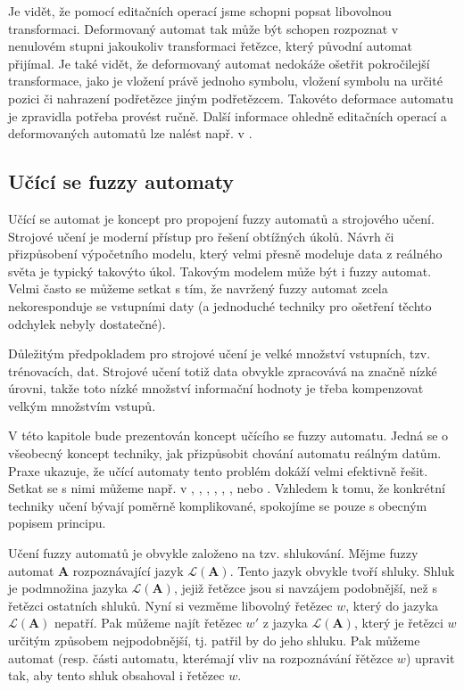 \documentclass[a4paper,10pt]{article}
\begin{document}
Je vidět, že pomocí editačních operací jsme schopni popsat libovolnou transformaci. Deformovaný automat tak může být schopen rozpoznat v nenulovém stupni jakoukoliv transformaci řetězce, který původní automat přijímal. Je také vidět, že deformovaný automat nedokáže ošetřit pokročilejší transformace, jako je vložení právě jednoho symbolu, vložení symbolu na určité pozici či nahrazení podřetězce jiným podřetězcem. Takovéto deformace automatu je zpravidla potřeba provést ručně. Další informace ohledně editačních operací a deformovaných automatů lze nalést např. v \cite{Ast+-FuzzAutEpsMovCmpFuzzMeasBtwStrs}.

\subsection{Učící se fuzzy automaty}
Učící se automat je koncept pro propojení fuzzy automatů a strojového učení. Strojové učení je moderní přístup pro řešení obtížných úkolů. Návrh či přizpůsobení výpočetního modelu, který velmi přesně modeluje data z reálného světa je typický takovýto úkol. Takovým modelem může být i fuzzy automat. Velmi často se můžeme setkat s tím, že navržený fuzzy automat zcela nekoresponduje se vstupními daty (a jednoduché techniky pro ošetření těchto odchylek nebyly dostatečné). 

Důležitým předpokladem pro strojové učení je velké množství vstupních, tzv. trénovacích, dat. Strojové učení totiž data obvykle zpracovává na značně nízké úrovni, takže toto nízké množství informační hodnoty je třeba kompenzovat velkým množstvím vstupů.

V této kapitole bude prezentován koncept učícího se fuzzy automatu. Jedná se o všeobecný koncept techniky, jak přizpůsobit chování automatu reálným datům. Praxe ukazuje, že učící automaty tento problém dokáží velmi efektivně řešit. Setkat se s nimi můžeme např. v \cite{FuLi-ForLeaAutAutGam}, \cite{WeeFu-FormFuzAutAppModLeaSys}, \cite{GilOmlTho-EquKnoRep+}, \cite{TzaRig-StaAnaAdaFuzzConSysUsiPetrNetLeaAut}, \cite{PatMor-EdgDetTecFuzzLogCEllLeaAutFuzzImPro}, \cite{MarMeySol-HybMetGasDifModFuzCelAutImSha}, \cite{SinGha+HybrEdgDetMetFuzSetTheCelLeaAut} \cite{AstGariGonVillFar-ApprStrMatUsiDefFuzzAutLearExpr} nebo \cite{ZhiMinLan-EvoStraIndFuFiStaAu}. Vzhledem k tomu, že konkrétní techniky učení bývají poměrně komplikované, spokojíme se pouze s obecným popisem principu.

Učení fuzzy automatů je obvykle založeno na tzv. shlukování. Mějme fuzzy automat $\mathbf{A}$ rozpoznávající jazyk  $\mathcal{L}(\mathbf{A})$. Tento jazyk obvykle tvoří shluky. Shluk je podmnožina jazyka $\mathcal{L}(\mathbf{A})$, jejiž řetězce jsou si navzájem podobnější, než s řetězci ostatních shluků. Nyní si vezměme libovolný řetězec $w$, který do jazyka $\mathcal{L}(\mathbf{A})$ nepatří. Pak můžeme najít řetězec $w'$ z jazyka $\mathcal{L}(\mathbf{A})$, který je řetězci $w$ určitým způsobem nejpodobnější, tj. patřil by do jeho shluku. Pak můžeme automat (resp. části automatu, kterémají vliv na rozpoznávání řětězce $w$) upravit tak, aby tento shluk obsahoval i řetězec $w$.
\end{document}
